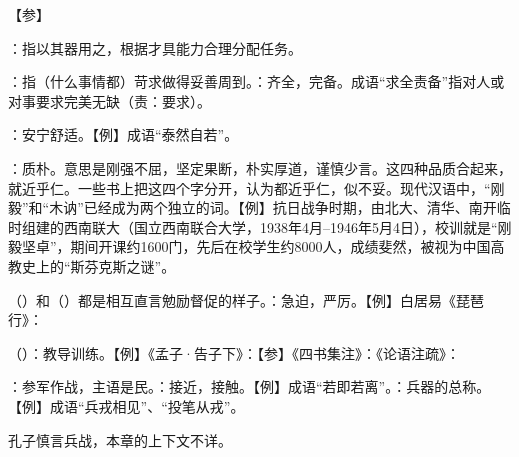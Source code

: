 {
【参】
}
{}


{
\item {}：指以其器用之，根据才具能力合理分配任务。
\item {}：指（什么事情都）苛求做得妥善周到。：齐全，完备。成语“求全责备”指对人或对事要求完美无缺（责：要求）。
}
{}


{
\item {}：安宁舒适。【例】成语“泰然自若”。
}
{}  %


{
\item {}：质朴。意思是刚强不屈，坚定果断，朴实厚道，谨慎少言。这四种品质合起来，就近乎仁。一些书上把这四个字分开，认为都近乎仁，似不妥。现代汉语中，“刚毅”和“木讷”已经成为两个独立的词。【例】抗日战争时期，由北大、清华、南开临时组建的西南联大（国立西南联合大学，1938年4月--1946年5月4日），校训就是“刚毅坚卓”，期间开课约1600门，先后在校学生约8000人，成绩斐然，被视为中国高教史上的“斯芬克斯之谜”。%
}
{}


{
\item {}（）和（）都是相互直言勉励督促的样子。：急迫，严厉。【例】白居易《琵琶行》：
}
{}


{
\item {}（）：教导训练。【例】《孟子·告子下》：【参】《四书集注》：《论语注疏》：
\item {}：参军作战，主语是民。：接近，接触。【例】成语“若即若离”。：兵器的总称。【例】成语“兵戎相见”、“投笔从戎”。

孔子慎言兵战，本章的上下文不详。%
}
{}


